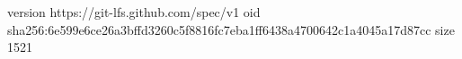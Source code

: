 version https://git-lfs.github.com/spec/v1
oid sha256:6e599e6ce26a3bffd3260c5f8816fc7eba1ff6438a4700642c1a4045a17d87cc
size 1521
